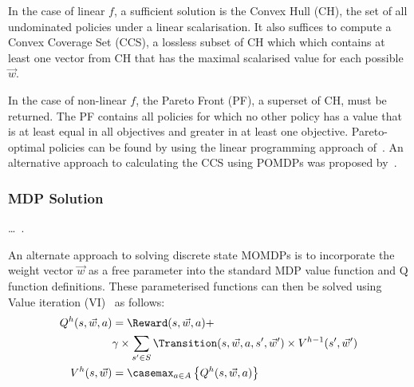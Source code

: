 In the case of linear {\footnotesize $ f $}, a sufficient solution is the Convex Hull (CH), the set of all undominated policies under a linear scalarisation. It also suffices to compute a Convex Coverage Set (CCS), a lossless subset of CH which which contains at least one vector from CH that has the maximal scalarised value for each possible {\footnotesize $ \vec{w} $}. 

In the case of non-linear {\footnotesize $ f $}, the Pareto Front (PF), a superset of CH, must be returned. The PF contains all policies for which no other policy has a value that is at least equal in all objectives and greater in at least one objective. Pareto-optimal policies can be found by using the linear programming approach of~\parencite{Viswanathan_TIMS_1977}. An alternative approach to calculating the CCS using POMDPs was proposed by~\parencite{White_LSS_1980}.

\subsubsection{MDP Solution}


\ldots~\parencite{Barrett_ICML_2008}.

An alternate approach to solving discrete state MOMDPs is to incorporate the weight vector {\footnotesize $ \vec{w} $} as a free parameter into the standard MDP value function and Q function definitions. These parameterised functions can then be solved using Value iteration (VI)~\parencite{Howard_MIT_1960} as follows:
{\footnotesize 
    \abovedisplayskip=0pt
    \belowdisplayskip=0pt
    \begin{align}
        Q^{h}(s, \vec{w}, a) &= \Reward(s, \vec{w}, a) + \nonumber \\
        & \gamma \times \sum_{s' \in S} \Transition(s, \vec{w}, a, s', \vec{w}') \times V^{h-1}(s', \vec{w}') \label{eq:qfunc}\\
        V^{h}(s, \vec{w}) &= \casemax_{a \in A} \left\{ Q^{h}(s, \vec{w}, a) \right\} \label{eq:vfunc}
    \end{align}
}%

